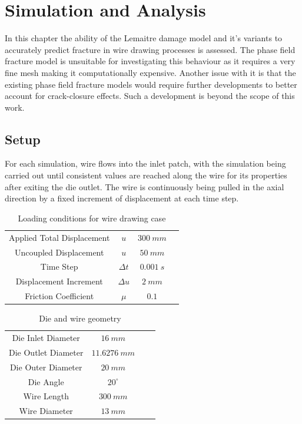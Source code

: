 
\chapter{Simulation and Analysis} %
\label{ch:Plasticity Model}

In this chapter the ability of the Lemaitre damage model and it's variants to accurately predict fracture in wire drawing processes is assessed. The phase field fracture model is unsuitable for investigating this behaviour as it requires a very fine mesh making it computationally expensive. Another issue with it is that the existing phase field fracture models would require further developments to better account for crack-closure effects. Such a development is beyond the scope of this work. 

\section{Setup}

For each simulation, wire flows into the inlet patch, with the simulation being
carried out until consistent values are reached along the wire for its properties after exiting the die outlet. The wire is continuously being pulled in the axial direction by a fixed increment of displacement at each time step.

\begin{table}[htb]
	\centering
		\begin{tabular}{cccc} \hline
		    Applied Total Displacement & $u$ & $300\ mm$ \\
		    Uncoupled Displacement & $u$ & $50\ mm$ \\
		    Time Step & $\Delta t$ & $0.001\ s$ \\
			Displacement Increment  & $\Delta u$ & $2\ mm$   \\
			Friction Coefficient & $\mu$ & $0.1$ \\
			\hline
		\end{tabular}
	\caption{Loading conditions for wire drawing case}
	\label{tab:material_properties}
\end{table}

\begin{table}[htb]
	\centering
		\begin{tabular}{cccc} \hline
		    Die Inlet Diameter & $16\ mm$ \\
		    Die Outlet Diameter & $11.6276\ mm$ \\
		    Die Outer Diameter & $20\ mm$ \\
		    Die Angle & $20^{\circ}$ \\
		    Wire Length & $300\ mm$ \\
		    Wire Diameter & $13\ mm$ \\
			\hline
		\end{tabular}
	\caption{Die and wire geometry}
	\label{tab:material_properties}
\end{table}

